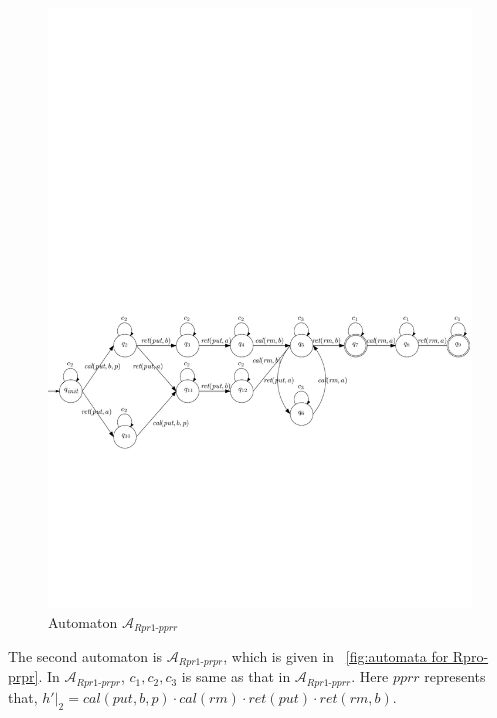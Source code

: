 \documentclass{llncs}
\begin{document}
\begin{figure}[htbp]
  \centering
  \includegraphics[width=1 \textwidth]{PIC_AUTO_UNMATCHED_Rpr1-pprr.pdf}
  \caption{Automaton $\mathcal{A}_{\textit{Rpr1-pprr}}$}
  \label{fig:automata for Rpro-pprr}
\end{figure}


The second automaton is $\mathcal{A}_{\textit{Rpr1-prpr}}$, which is given in \figurename~\ref{fig:automata for Rpro-prpr}. In $\mathcal{A}_{\textit{Rpr1-prpr}}$, $c_1, c_2, c_3$ is same as that in $\mathcal{A}_{\textit{Rpr1-pprr}}$. Here $\textit{pprr}$ represents that, $h' \vert_{2} = \textit{cal}(\textit{put},b,p) \cdot \textit{cal}(\textit{rm}) \cdot \textit{ret}(\textit{put}) \cdot \textit{ret}(\textit{rm},b)$.
\end{document}
